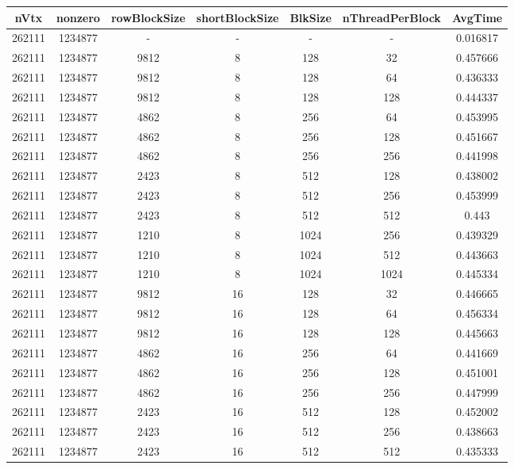 \documentclass[9pt]{article}
\begin{document}
\SetBgPosition{0.25cm,-5.0cm}
\begin{tabular}{|c|c|c|c|c|c|c| }  
\hline
nVtx  & nonzero  & rowBlockSize  & shortBlockSize  & BlkSize  & nThreadPerBlock  & AvgTime \\
\hline
262111  & 1234877  &  -  & -  & -  & -  &0.016817 \\
\hline
262111  & 1234877  & 9812  & 8  & 128  & 32  & 0.457666 \\
\hline
262111  & 1234877  & 9812  & 8  & 128  & 64  & 0.436333 \\
\hline
262111  & 1234877  & 9812  & 8  & 128  & 128  & 0.444337 \\
\hline
262111  & 1234877  & 4862  & 8  & 256  & 64  & 0.453995 \\
\hline
262111  & 1234877  & 4862  & 8  & 256  & 128  & 0.451667 \\
\hline
262111  & 1234877  & 4862  & 8  & 256  & 256  & 0.441998 \\
\hline
262111  & 1234877  & 2423  & 8  & 512  & 128  & 0.438002 \\
\hline
262111  & 1234877  & 2423  & 8  & 512  & 256  & 0.453999 \\
\hline
262111  & 1234877  & 2423  & 8  & 512  & 512  & 0.443 \\
\hline
262111  & 1234877  & 1210  & 8  & 1024  & 256  & 0.439329 \\
\hline
262111  & 1234877  & 1210  & 8  & 1024  & 512  & 0.443663 \\
\hline
262111  & 1234877  & 1210  & 8  & 1024  & 1024  & 0.445334 \\
\hline
262111  & 1234877  & 9812  & 16  & 128  & 32  & 0.446665 \\
\hline
262111  & 1234877  & 9812  & 16  & 128  & 64  & 0.456334 \\
\hline
262111  & 1234877  & 9812  & 16  & 128  & 128  & 0.445663 \\
\hline
262111  & 1234877  & 4862  & 16  & 256  & 64  & 0.441669 \\
\hline
262111  & 1234877  & 4862  & 16  & 256  & 128  & 0.451001 \\
\hline
262111  & 1234877  & 4862  & 16  & 256  & 256  & 0.447999 \\
\hline
262111  & 1234877  & 2423  & 16  & 512  & 128  & 0.452002 \\
\hline
262111  & 1234877  & 2423  & 16  & 512  & 256  & 0.438663 \\
\hline
262111  & 1234877  & 2423  & 16  & 512  & 512  & 0.435333 \\

\end{tabular}
\end{document}
